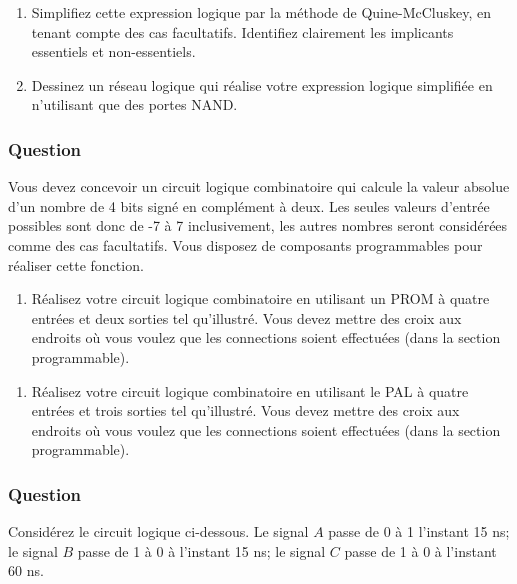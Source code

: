\documentclass[11pt]{article}
\begin{document}
\begin{enumerate}
\item Simplifiez cette expression logique par la méthode de
Quine-McCluskey, en tenant compte des cas facultatifs. Identifiez
clairement les implicants essentiels et non-essentiels.

\item Dessinez un réseau logique qui réalise votre expression logique
simplifiée en n'utilisant que des portes NAND.
\end{enumerate}

\subsubsection*{Question}
\label{sec:org062ae78}
Vous devez concevoir un circuit logique combinatoire qui calcule la
valeur absolue d'un nombre de 4 bits signé en complément à deux. Les
seules valeurs d'entrée possibles sont donc de -7 à 7 inclusivement,
les autres nombres seront considérées comme des cas facultatifs. Vous
disposez de composants programmables pour réaliser cette fonction.

\begin{enumerate}
\item Réalisez votre circuit logique combinatoire en utilisant un PROM à
quatre entrées et deux sorties tel qu'illustré.
Vous devez mettre des croix aux endroits où vous voulez que les
connections soient effectuées (dans la section programmable).
\end{enumerate}
\begin{center}

\end{center}

\begin{enumerate}
\item Réalisez votre circuit logique combinatoire en utilisant le PAL à
quatre entrées et trois sorties tel qu'illustré.
Vous devez mettre des croix aux endroits où vous voulez que les
connections soient effectuées (dans la section programmable).
\end{enumerate}
\begin{center}

\end{center}

\subsubsection*{Question}
\label{sec:org44db7e6}
Considérez le circuit logique ci-dessous. Le signal \(A\) passe de 0 à 1
l'instant 15 ns; le signal \(B\) passe de 1 à 0 à l'instant 15 ns; le
signal \(C\) passe de 1 à 0 à l'instant 60 ns.
\begin{center}

\end{center}
\end{document}
